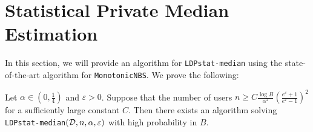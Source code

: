 \section{Statistical Private Median Estimation}\label{sec:statistical-median}
In this section, we will provide an algorithm for \texttt{LDPstat-median} using the state-of-the-art algorithm for \texttt{MonotonicNBS}. We prove the following:

\begin{theorem}\label{thm:main-stat}
Let $\alpha \in \left(0,\frac{1}{4}\right)$ and $\varepsilon
>0$. Suppose that the number of users $n\geq C\frac{\log B}{\alpha^2}\left(\frac{e^\varepsilon+1}{e^\varepsilon-1}\right)^2$ for a sufficiently large constant $C$. Then there exists an algorithm solving \texttt{LDPstat-median}$(\mathcal{D},n,\alpha,\varepsilon)$ with high probability in $B$. 
\end{theorem}

